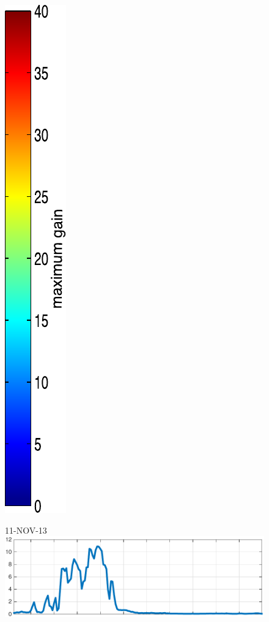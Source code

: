 \begin{figure}
\begin{minipage}[c]{\mylength}
\includegraphics[valign=t,trim=2pt -8pt 0 5pt,width=\colorbarwidth,totalheight=\eventheight]{events/colorbar-40.pdf}
\end{minipage}
\begin{minipage}[c]{\mylength}
\centering \scriptsize 11-NOV-13 \\
\includegraphics[valign=t,trim=0 0 5pt 0,angle=90,origin=tr,width=\sunintwidth,totalheight=\eventheight]{events/20131111-intensity.pdf}

\end{minipage}
\end{figure}
